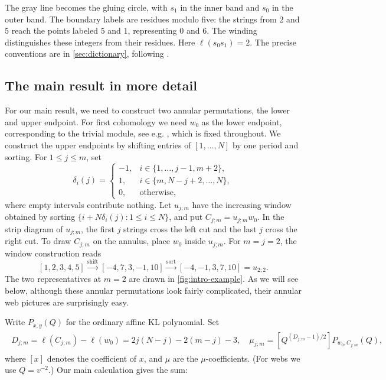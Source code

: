 \documentclass[a4paper,11pt]{amsart}
\numberwithin{equation}{subsection}
\theoremstyle{plain}
\theoremstyle{definition}
\theoremstyle{remark}
\begin{document}
The gray line becomes the gluing circle, with $s_1$ in the inner
band and $s_0$ in the outer band. The boundary labels are residues
modulo five: the strings from $2$ and $5$ reach the points labeled
$5$ and $1$, representing $0$ and $6$.
The winding distinguishes these integers from their residues.
Here $\ell(s_0s_1)=2$.
The precise conventions are in \autoref{sec:dictionary}, following
\cite[Section~2A]{HT}.

\subsection{The main result in more detail}

For our main result, we need to construct two annular permutations, the lower and upper endpoint.
For first cohomology we need $w_0$ as the lower endpoint,
corresponding to the trivial module, see e.g. \cite[Section~4]{SX}, which is fixed throughout.
We construct the upper endpoints by shifting entries of
$[1,\ldots,N]$ by one period and sorting. For $1\le j\le m$, set
\[
\delta_i(j)=\begin{cases}
-1,&i\in\{1,\ldots,j-1,m+2\},\\
1,&i\in\{m,N-j+2,\ldots,N\},\\
0,&\text{otherwise},
\end{cases}
\]
where empty intervals contribute nothing. Let $u_{j;m}$ have the
increasing window obtained by sorting
$\{i+N\delta_i(j):1\le i\le N\}$, and put $C_{j;m}=u_{j;m}w_0$.
In the strip diagram of $u_{j;m}$, the first $j$ strings cross the
left cut and the last $j$ cross the right cut.
To draw $C_{j;m}$ on the annulus, place $w_0$ inside $u_{j;m}$.
For $m=j=2$, the window construction reads
\[
[1,2,3,4,5]
\xrightarrow{\text{shift}}[-4,7,3,-1,10]
\xrightarrow{\text{sort}}[-4,-1,3,7,10]=u_{2;2}.
\]
The two representatives at $m=2$ are drawn in
\autoref{fig:intro-example}. As we will see below, 
although these annular permutations look fairly complicated, their annular web pictures are surprisingly easy.

Write $P_{x,y}(Q)$ for the ordinary affine KL polynomial. Set
\begin{gather*}
\begin{aligned}
D_{j;m}=\ell(C_{j;m})-\ell(w_0)
=2j(N-j)-2(m-j)-3,\quad
\mu_{j;m}=[Q^{(D_{j;m}-1)/2}]P_{w_0,C_{j;m}}(Q),
\end{aligned}
\end{gather*}
where $[x]$ denotes the coefficient of $x$, and $\mu$ are the $\mu$-coefficients.
(For webs we use $Q=v^{-2}$.) Our main calculation gives the sum:
\end{document}
